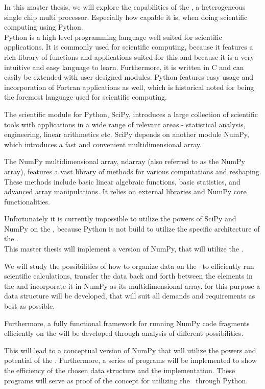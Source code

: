 In this master thesis, we will explore the capabilities of
the \CBE{}, a heterogeneous single chip multi processor. Especially
how capable it is, when doing scientific computing using Python.\\

Python is a high level programming language well suited for scientific
applications. It is commonly used for scientific computing, because it
features a rich library of functions and applications suited for this
and because it is a very intuitive and easy language to
learn. Furthermore, it is written in C and can easily be extended with
user designed modules. Python features easy usage and incorporation of
Fortran applications as well, which is historical noted for being the
foremost language used for scientific computing.

The scientific module for Python, SciPy, introduces a large collection
of scientific tools with applications in a wide range of relevant
areas - statistical analysis, engineering, linear arithmetics etc.
SciPy depends on another module NumPy, which introduces a fast and
convenient multidimensional array.

The NumPy multidimensional array, ndarray (also referred to as the
NumPy array), features a vast library of methods for various
computations and reshaping. These methods include basic linear
algebraic functions, basic statistics, and advanced array
manipulations. It relies on external libraries and NumPy core
functionalities.

Unfortunately it is currently impossible to utilize the powers of
SciPy and NumPy on the \CBE{}, because Python is not build to utilize
the specific architecture of the \CBE{}. \\

This master thesis will implement a version of NumPy, that will
utilize the \CBE{}.

We will study the possibilities of how to organize data on the \CBE\
to efficiently run scientific calculations, transfer the data back and
forth between the elements in the \CBE{} and incorporate it in NumPy
as its multidimensional array. for this purpose a data structure will
be developed, that will suit all demands and requirements as best as
possible.

Furthermore, a fully functional framework for running NumPy code
fragments efficiently on the \SPEv{'s} will be developed through
analysis of different possibilities.

This will lead to a conceptual version of NumPy that will utilize the
powers and potential of the \CBE{}. Furthermore, a series of programs
will be implemented to show the efficiency of the chosen data
structure and the implementation. These programs will serve as proof
of the concept for utilizing the \CBE\ through Python.\\

